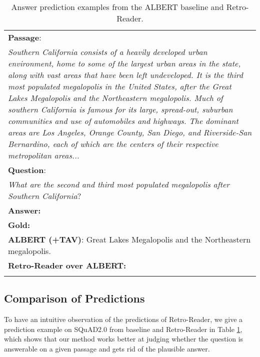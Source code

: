 \documentclass[letterpaper]{article} \usepackage{aaai21}  \usepackage{times}  \usepackage{helvet} \usepackage{courier}  \usepackage[hyphens]{url}  \usepackage{graphicx}
\begin{document}
\begin{table}
	\begin{center}
\begin{tabular}{|p{8cm}|}
			\hline
			\textbf{Passage}: \\
			\textit{Southern California consists of a heavily developed urban environment, home to some of the largest urban areas in the state, along with vast areas that have been left undeveloped. \textcolor[RGB]{0,145,147}{It is the third most populated megalopolis in the United States, after the Great Lakes Megalopolis and the Northeastern megalopolis.} Much of southern California is famous for its large, spread-out, suburban communities and use of automobiles and highways. The dominant areas are Los Angeles, Orange County, San Diego, and Riverside-San Bernardino, each of which are the centers of their respective metropolitan areas...}\\ 
			\hline
\textbf{Question}: \\
			\textit{What are the second and third most populated megalopolis after Southern California}?\\    
			\hline
			\textbf{Answer:} \\
			\textbf{Gold: }  \\
			\textbf{ALBERT (+TAV)}: Great Lakes Megalopolis and the Northeastern megalopolis. \\
			\textbf{Retro-Reader over ALBERT:}  \\
			 \\
			\hline
		\end{tabular}
	\end{center}
	\caption{\label{com_exps} Answer prediction examples from the ALBERT baseline and Retro-Reader.}
\end{table}

\subsection{Comparison of Predictions}
To have an intuitive observation of the predictions of Retro-Reader, we give a prediction example on SQuAD2.0 from baseline and Retro-Reader in Table \ref{com_exps}, which shows that our method works better at judging whether the question is answerable on a given passage and gets rid of the plausible answer.
\end{document}
